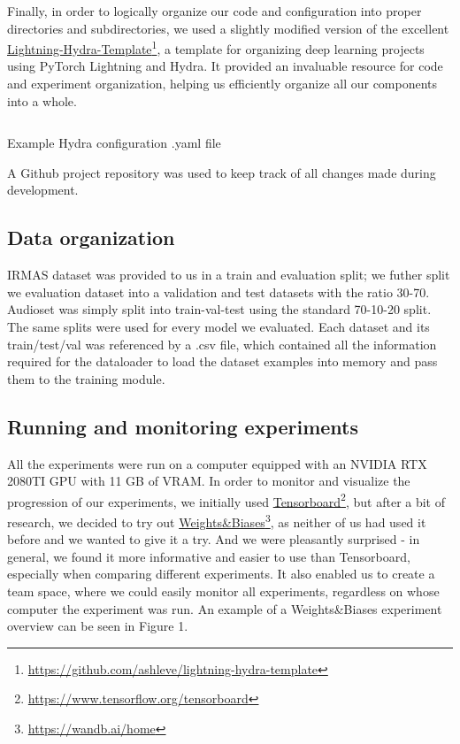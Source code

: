 \documentclass{ol-softwaremanual}
\newcommand{\doclink}[2]{\href{#1}{#2}\footnote{\url{#1}}}
\begin{document}
Finally, in order to logically organize our code and configuration into proper directories and subdirectories, we used a slightly modified version of the excellent \doclink{https://github.com/ashleve/lightning-hydra-template}{Lightning-Hydra-Template}, a template for organizing deep learning projects using PyTorch Lightning and Hydra. It provided an invaluable resource for code and experiment organization, helping us efficiently organize all our components into a whole. \newline

\begin{listing}
\inputminted{yaml}{code/hydra_example.m}
\caption{Example Hydra configuration .yaml file}
\label{listing:octave}
\end{listing}

A Github project repository was used to keep track of all changes made during development. 
\subsection{Data organization}

IRMAS dataset was provided to us in a train and evaluation split; we futher split we evaluation dataset into  a validation and test datasets with the ratio 30-70. Audioset was simply split into train-val-test using the standard 70-10-20 split. The same splits were used for every model we evaluated. Each dataset and its train/test/val was referenced by a .csv file, which contained all the information required for the dataloader to load the dataset examples into memory and pass them to the training module. 

\subsection{Running and monitoring experiments}

All the experiments were run on a computer equipped with an NVIDIA RTX 2080TI GPU with 11 GB of VRAM. In order to monitor and visualize the progression of our experiments, we initially used \doclink{https://www.tensorflow.org/tensorboard}{Tensorboard}, but after a bit of research, we decided to try out \doclink{https://wandb.ai/home}{Weights\&Biases}, as neither of us had used it before and we wanted to give it a try. And we were pleasantly surprised - in general, we found it more informative and easier to use than Tensorboard, especially when comparing different experiments. It also enabled us to create a team space, where we could easily monitor all experiments, regardless on whose computer the experiment was run. An example of a Weights\&Biases experiment overview can be seen in Figure 1. \\
\end{document}
